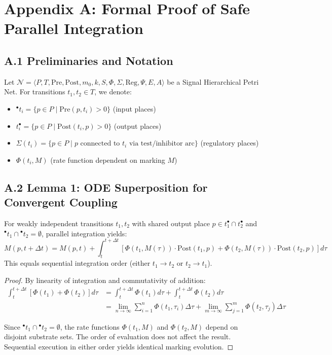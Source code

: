 
\section*{Appendix A: Formal Proof of Safe Parallel Integration}

\subsection*{A.1 Preliminaries and Notation}

Let $\mathcal{N} = \langle P, T, \text{Pre}, \text{Post}, m_0, k, S, \Phi, \Sigma, \text{Reg}, \Psi, E, A \rangle$ be a Signal Hierarchical Petri Net. For transitions $t_1, t_2 \in T$, we denote:
\begin{itemize}
\item ${}^\bullet t_i = \{p \in P \mid \text{Pre}(p, t_i) > 0\}$ (input places)
\item $t_i^\bullet = \{p \in P \mid \text{Post}(t_i, p) > 0\}$ (output places)
\item $\Sigma(t_i) = \{p \in P \mid p \text{ connected to } t_i \text{ via test/inhibitor arc}\}$ (regulatory places)
\item $\Phi(t_i, M)$ (rate function dependent on marking $M$)
\end{itemize}

\subsection*{A.2 Lemma 1: ODE Superposition for Convergent Coupling}

\begin{lemma}
For weakly independent transitions $t_1, t_2$ with shared output place $p \in t_1^\bullet \cap t_2^\bullet$ and ${}^\bullet t_1 \cap {}^\bullet t_2 = \emptyset$, parallel integration yields:
\[
M(p, t + \Delta t) = M(p, t) + \int_t^{t+\Delta t} \left[\Phi(t_1, M(\tau)) \cdot \text{Post}(t_1, p) + \Phi(t_2, M(\tau)) \cdot \text{Post}(t_2, p)\right] d\tau
\]
This equals sequential integration order (either $t_1 \to t_2$ or $t_2 \to t_1$).
\end{lemma}

\begin{proof}
By linearity of integration and commutativity of addition:
\begin{align*}
\int_t^{t+\Delta t} \left[\Phi(t_1) + \Phi(t_2)\right] d\tau &= \int_t^{t+\Delta t} \Phi(t_1) d\tau + \int_t^{t+\Delta t} \Phi(t_2) d\tau \\
&= \lim_{n \to \infty} \sum_{i=1}^n \Phi(t_1, \tau_i) \Delta\tau + \lim_{m \to \infty} \sum_{j=1}^m \Phi(t_2, \tau_j) \Delta\tau
\end{align*}

Since ${}^\bullet t_1 \cap {}^\bullet t_2 = \emptyset$, the rate functions $\Phi(t_1, M)$ and $\Phi(t_2, M)$ depend on disjoint substrate sets. The order of evaluation does not affect the result. Sequential execution in either order yields identical marking evolution.
\end{proof}

